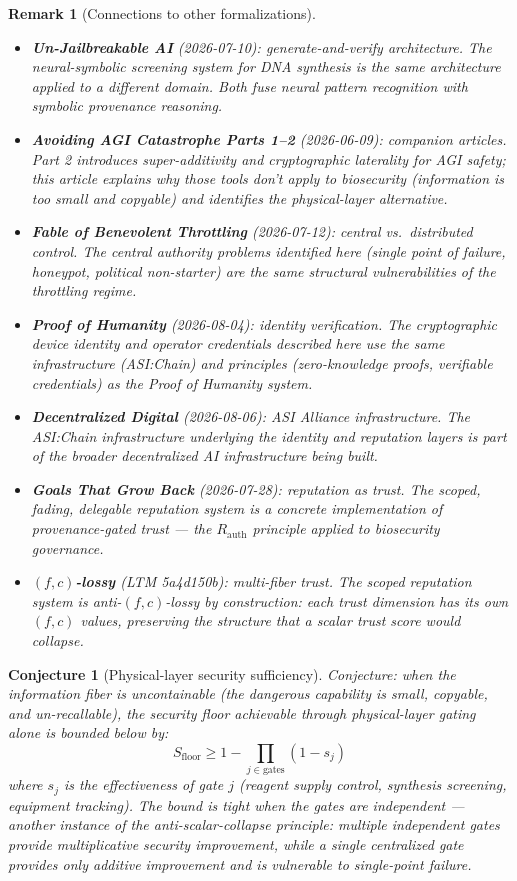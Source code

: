 \documentclass[11pt,a4paper]{article}
\newtheorem{conjecture}[definition]{Conjecture}
\newtheorem{remark}[definition]{Remark}
\begin{document}
\begin{remark}[Connections to other formalizations]
\begin{itemize}
\item \textbf{Un-Jailbreakable AI} (2026-07-10): generate-and-verify
  architecture. The neural-symbolic screening system for DNA synthesis
  is the same architecture applied to a different domain. Both fuse
  neural pattern recognition with symbolic provenance reasoning.
\item \textbf{Avoiding AGI Catastrophe Parts 1--2} (2026-06-09):
  companion articles. Part 2 introduces super-additivity and
  cryptographic laterality for AGI safety; this article explains
  why those tools don't apply to biosecurity (information is too
  small and copyable) and identifies the physical-layer alternative.
\item \textbf{Fable of Benevolent Throttling} (2026-07-12): central
  vs.\ distributed control. The central authority problems identified
  here (single point of failure, honeypot, political non-starter)
  are the same structural vulnerabilities of the throttling regime.
\item \textbf{Proof of Humanity} (2026-08-04): identity verification.
  The cryptographic device identity and operator credentials described
  here use the same infrastructure (ASI:Chain) and principles
  (zero-knowledge proofs, verifiable credentials) as the Proof of
  Humanity system.
\item \textbf{Decentralized Digital} (2026-08-06): ASI Alliance
  infrastructure. The ASI:Chain infrastructure underlying the
  identity and reputation layers is part of the broader decentralized
  AI infrastructure being built.
\item \textbf{Goals That Grow Back} (2026-07-28): reputation as trust.
  The scoped, fading, delegable reputation system is a concrete
  implementation of provenance-gated trust --- the $R_{\text{auth}}$
  principle applied to biosecurity governance.
\item \textbf{$(f,c)$-lossy} (LTM 5a4d150b): multi-fiber trust.
  The scoped reputation system is anti-$(f,c)$-lossy by construction:
  each trust dimension has its own $(f,c)$ values, preserving the
  structure that a scalar trust score would collapse.
\end{itemize}
\end{remark}

\begin{conjecture}[Physical-layer security sufficiency]
Conjecture: when the information fiber is uncontainable (the dangerous
capability is small, copyable, and un-recallable), the security floor
achievable through physical-layer gating alone is bounded below by:
\[
  S_{\text{floor}} \geq 1 - \prod_{j \in \text{gates}}
  (1 - s_j)
\]
where $s_j$ is the effectiveness of gate $j$ (reagent supply control,
synthesis screening, equipment tracking). The bound is tight when the
gates are independent --- another instance of the anti-scalar-collapse
principle: multiple independent gates provide multiplicative security
improvement, while a single centralized gate provides only additive
improvement and is vulnerable to single-point failure.
\end{conjecture}
\end{document}
